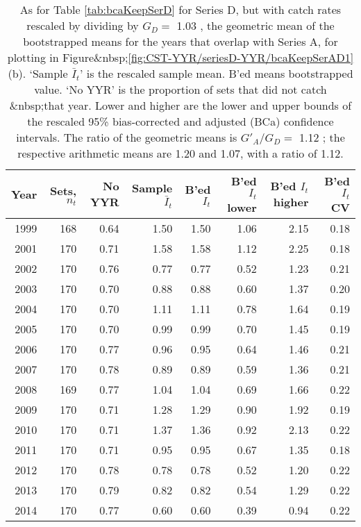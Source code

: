 \begin{table}[tp]
\centering
\caption{As for Table \ref{tab:bcaKeepSerD} for Series D, 
     but with catch rates rescaled by dividing
     by $G_{D}=$ 1.03 , 
     the geometric mean of the bootstrapped means for the years that overlap
     with Series A, for plotting in 
     Figure&nbsp;\ref{fig:CST-YYR/seriesD-YYR/bcaKeepSerAD1}(b).
     `Sample $\bar{I}_t$' is the rescaled sample mean. B'ed means bootstrapped 
     value. `No YYR' is the proportion of sets that did not catch \spName&nbsp;that
     year. Lower and higher are the 
     lower and upper bounds of the rescaled 
     95\% bias-corrected and adjusted (BCa)
     confidence intervals. The ratio of the geometric means is
     $G'_{A}/G_{D}=$ 1.12 ; the respective arithmetic means 
     are 1.20 and 1.07, with a ratio of  1.12.} 
\label{tab:serDscaled}
\begin{tabular}{rrrrrrrr}
  \hline
Year & Sets, $n_t$ & No YYR & Sample $\bar{I}_t$ & B'ed $I_t$ & B'ed $I_t$ lower & B'ed $I_t$ higher & B'ed $I_t$ CV \\ 
  \hline
1999 & 168 & 0.64 & 1.50 & 1.50 & 1.06 & 2.15 & 0.18 \\ 
  2001 & 170 & 0.71 & 1.58 & 1.58 & 1.12 & 2.25 & 0.18 \\ 
  2002 & 170 & 0.76 & 0.77 & 0.77 & 0.52 & 1.23 & 0.21 \\ 
  2003 & 170 & 0.70 & 0.88 & 0.88 & 0.60 & 1.37 & 0.20 \\ 
  2004 & 170 & 0.70 & 1.11 & 1.11 & 0.78 & 1.64 & 0.19 \\ 
  2005 & 170 & 0.70 & 0.99 & 0.99 & 0.70 & 1.45 & 0.19 \\ 
  2006 & 170 & 0.77 & 0.96 & 0.95 & 0.64 & 1.46 & 0.21 \\ 
  2007 & 170 & 0.78 & 0.89 & 0.89 & 0.59 & 1.36 & 0.21 \\ 
  2008 & 169 & 0.77 & 1.04 & 1.04 & 0.69 & 1.66 & 0.22 \\ 
  2009 & 170 & 0.71 & 1.28 & 1.29 & 0.90 & 1.92 & 0.19 \\ 
  2010 & 170 & 0.71 & 1.37 & 1.36 & 0.92 & 2.13 & 0.22 \\ 
  2011 & 170 & 0.71 & 0.95 & 0.95 & 0.67 & 1.35 & 0.18 \\ 
  2012 & 170 & 0.78 & 0.78 & 0.78 & 0.52 & 1.20 & 0.22 \\ 
  2013 & 170 & 0.79 & 0.82 & 0.82 & 0.54 & 1.29 & 0.22 \\ 
  2014 & 170 & 0.77 & 0.60 & 0.60 & 0.39 & 0.94 & 0.22 \\ 
   \hline
\end{tabular}
\end{table}

